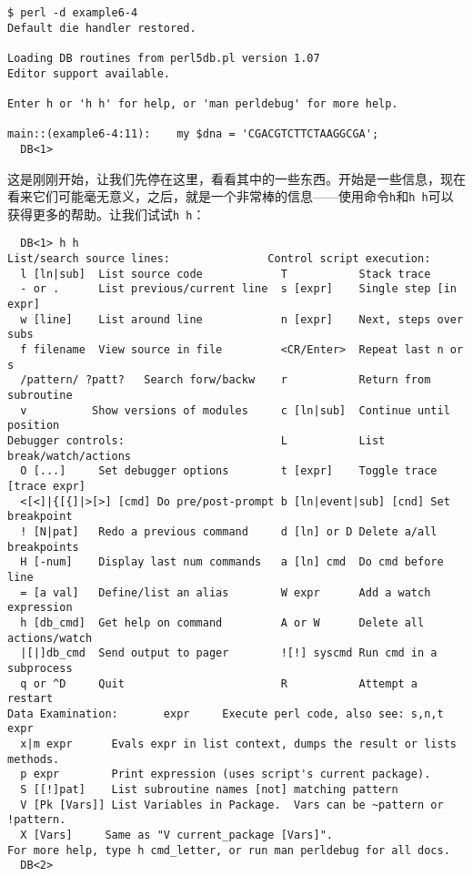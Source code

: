 \begin{lstlisting}
$ perl -d example6-4
Default die handler restored.

Loading DB routines from perl5db.pl version 1.07
Editor support available.

Enter h or 'h h' for help, or 'man perldebug' for more help.

main::(example6-4:11):    my $dna = 'CGACGTCTTCTAAGGCGA';
  DB<1> 
\end{lstlisting}

这是刚刚开始，让我们先停在这里，看看其中的一些东西。开始是一些信息，现在看来它们可能毫无意义，之后，就是一个非常棒的信息——使用命令\verb|h|和\verb|h h|可以获得更多的帮助。让我们试试\verb|h h|：

\begin{lstlisting}
  DB<1> h h
List/search source lines:               Control script execution:
  l [ln|sub]  List source code            T           Stack trace
  - or .      List previous/current line  s [expr]    Single step [in expr]
  w [line]    List around line            n [expr]    Next, steps over subs
  f filename  View source in file         <CR/Enter>  Repeat last n or s
  /pattern/ ?patt?   Search forw/backw    r           Return from subroutine
  v          Show versions of modules     c [ln|sub]  Continue until position
Debugger controls:                        L           List break/watch/actions
  O [...]     Set debugger options        t [expr]    Toggle trace [trace expr]
  <[<]|{[{]|>[>] [cmd] Do pre/post-prompt b [ln|event|sub] [cnd] Set breakpoint
  ! [N|pat]   Redo a previous command     d [ln] or D Delete a/all breakpoints
  H [-num]    Display last num commands   a [ln] cmd  Do cmd before line
  = [a val]   Define/list an alias        W expr      Add a watch expression
  h [db_cmd]  Get help on command         A or W      Delete all actions/watch
  |[|]db_cmd  Send output to pager        ![!] syscmd Run cmd in a subprocess
  q or ^D     Quit                        R           Attempt a restart
Data Examination:       expr     Execute perl code, also see: s,n,t expr
  x|m expr      Evals expr in list context, dumps the result or lists methods.
  p expr        Print expression (uses script's current package).
  S [[!]pat]    List subroutine names [not] matching pattern
  V [Pk [Vars]] List Variables in Package.  Vars can be ~pattern or !pattern.
  X [Vars]     Same as "V current_package [Vars]".
For more help, type h cmd_letter, or run man perldebug for all docs.
  DB<2> 
\end{lstlisting}

